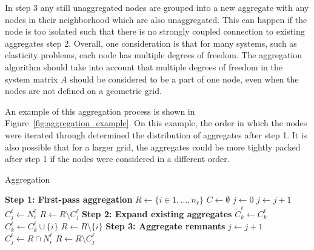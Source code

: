 In step 3 any still unaggregated nodes are grouped into a new aggregate with any nodes in their neighborhood which are also unaggregated. This can happen if the node is too isolated such that there is no strongly coupled connection to existing aggregates step 2. Overall, one consideration is that for many systems, such as elasticity problems, each node has multiple degrees of freedom. The aggregation algorithm should take into account that multiple degrees of freedom in the system matrix $A$ should be considered to be a part of one node, even when the nodes are not defined on a geometric grid.

An example of this aggregation process is shown in Figure~\ref{fig:aggregation_example}. On this example, the order in which the nodes were iterated through determined the distribution of aggregates after step 1. It is also possible that for a larger grid, the aggregates could be more tightly packed after step 1 if the nodes were considered in a different order.

\begin{algorithm}
	\caption{Aggregation}\label{alg:aggregation}
	\begin{algorithmic}[1]
			\Statex \textbf{Step 1: First-pass aggregation}
			\State $R \gets \{ i \in 1, \ldots, n_\ell\}$ 
			\State $C \gets \emptyset$ 
			\State $j \gets 0$ 
					\State $j \gets j+1$
					\State $C_j^\ell \gets N_i^\ell$ 
					\State $R \gets R \setminus C_j^\ell$ 
				\EndIf
			\EndFor {}
			\Statex
			\Statex \textbf{Step 2: Expand existing aggregates}
				\State $\tilde{C}_k^\ell \gets C_k^\ell$
			\EndFor
			 
				 
					\State $C_k^\ell \gets C_k^\ell \cup \{ i \}$ 
					\State $R \gets R \setminus \{ i \} $
				\EndIf
			\EndFor
			\Statex
			\Statex \textbf{Step 3: Aggregate remnants}
			 
				\State $j \gets j + 1$
				\State $C_j^\ell \gets R \cap N_i^\ell$ 
				\State $R \gets R \setminus C_j^\ell$
			\EndFor
		\EndProcedure
	\end{algorithmic}
\end{algorithm}

